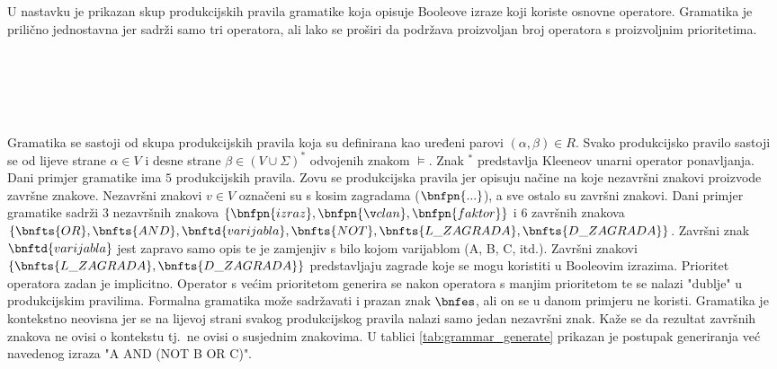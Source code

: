 \documentclass[times, utf8, diplomski]{fer}
\begin{document}
\noindent
U nastavku je prikazan skup produkcijskih pravila gramatike koja opisuje Booleove izraze koji koriste osnovne operatore. Gramatika je prilično jednostavna jer sadrži samo tri operatora, ali lako se proširi da podržava proizvoljan broj operatora s proizvoljnim prioritetima.
%
\begin{bnf}
	 \\
	 \\
	 \\
	 \\
\end{bnf}

Gramatika se sastoji od skupa produkcijskih pravila koja su definirana kao uređeni parovi $(\alpha, \beta) \in R$. Svako produkcijsko pravilo sastoji se od lijeve strane $\alpha \in V$ i desne strane $\beta \in (V \cup \Sigma)^{*}$ odvojenih znakom $\models$. Znak $^{*}$ predstavlja Kleeneov unarni operator ponavljanja. Dani primjer gramatike ima $5$ produkcijskih pravila. Zovu se produkcijska pravila jer opisuju načine na koje nezavršni znakovi proizvode završne znakove. Nezavršni znakovi $v \in V$ označeni su s kosim zagradama ($\bnfpn{...}$), a sve ostalo su završni znakovi. Dani primjer gramatike sadrži $3$ nezavršnih znakova $\{ \bnfpn{izraz}, \bnfpn{član}, \bnfpn{faktor} \}$ i $6$ završnih znakova $\{ \bnfts{OR}, \bnfts{AND}, \bnftd{varijabla}, \bnfts{NOT}, \bnfts{L\_ZAGRADA}, \bnfts{D\_ZAGRADA} \}$. Završni znak $\bnftd{varijabla}$ jest zapravo samo opis te je zamjenjiv s bilo kojom varijablom (A, B, C, itd.). Završni znakovi $\{\bnfts{L\_ZAGRADA}, \bnfts{D\_ZAGRADA}\}$ predstavljaju zagrade koje se mogu koristiti u Booleovim izrazima. Prioritet operatora zadan je implicitno. Operator s većim prioritetom generira se nakon operatora s manjim prioritetom te se nalazi "dublje" u produkcijskim pravilima. Formalna gramatika može sadržavati i prazan znak $\bnfes$, ali on se u danom primjeru ne koristi. Gramatika je kontekstno neovisna jer se na lijevoj strani svakog produkcijskog pravila nalazi samo jedan nezavršni znak. Kaže se da rezultat završnih znakova ne ovisi o kontekstu tj.~ne ovisi o susjednim znakovima. U tablici \ref{tab:grammar_generate} prikazan je postupak generiranja već navedenog izraza "A AND (NOT B OR C)".
\end{document}
